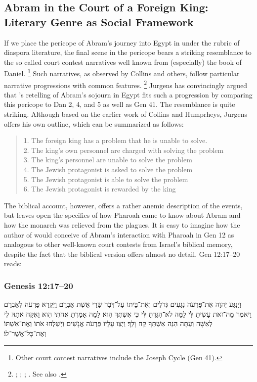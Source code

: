 \subsection{Abram in the Court of a Foreign King: Literary Genre as Social Framework}

If we place the pericope of Abram's journey into Egypt in \ga under the rubric of diaspora literature, the final scene in the pericope bears a striking resemblance to the so called court contest narratives well known from (especially) the book of Daniel.%
    \footnote{Other court contest narratives include the Joseph Cycle (Gen 41).}
Such narratives, as observed by Collins and others, follow particular narrative progressions with common features.%
    \footnote{\Cite[38--52]{collins1993}; \cite{humphreys_jbl1973}; \cite{collins_jbl1975}; \cite{wills1990}. See also \cite{niditch-doran_jbl1977}.}
Jurgens has convincingly argued that \ga's retelling of Abram's sojourn in Egypt fits such a progression by comparing this pericope to Dan 2, 4, and 5 as well as Gen 41. The resemblance is quite striking. Although based on the earlier work of Collins and Humprheys, Jurgens offers his own outline, which can be summarized as follows:%
    \autocite[21]{jurgens_jsj2018}
\begin{quote}
    1. The foreign king has a problem that he is unable to solve.\\
    2. The king's own personnel are charged with solving the problem\\
    3. The king's personnel are unable to solve the problem\\
    4. The Jewish protagonist is asked to solve the problem\\
    5. The Jewish protagonist is able to solve the problem\\
    6. The Jewish protagonist is rewarded by the king
\end{quote}
\noindent
The biblical account, however, offers a rather anemic description of the events, but leaves open the specifics of how Pharoah came to know about Abram and how the monarch was relieved from the plagues. 
It is easy to imagine how the author of \ga would conceive of Abram's interaction with Pharoah in Gen 12 as analogous to other well-known court contests from Israel's biblical memory, despite the fact that the biblical version offers almost no detail. Gen 12:17--20 reads: 

\subsubsection{Genesis 12:17--20}
\begin{hebrewtext}
    ‏וַיְנַגַּע יְהוָה אֶת־פַּרְעֹה נְגָעִים גְּדֹלִים וְאֶת־בֵּיתוֹ עַל־דְּבַר שָׂרַי אֵשֶׁת אַבְרָם׃
    וַיִּקְרָא פַרְעֹה לְאַבְרָם וַיֹּאמֶר מַה־זֹּאת עָשִׂיתָ לִּי לָמָּה לֹא־הִגַּדְתָּ לִּי כִּי אִשְׁתְּךָ הִוא׃
    לָמָה אָמַרְתָּ אֲחֹתִי הִוא וָאֶקַּח אֹתָהּ לִי לְאִשָּׁה וְעַתָּה הִנֵּה אִשְׁתְּךָ קַח וָלֵךְ׃ 
    וַיְצַו עָלָיו פַּרְעֹה אֲנָשִׁים וַיְשַׁלְּחוּ אֹתוֹ וְאֶת־אִשְׁתּוֹ וְאֶת־כָּל־אֲשֶׁר־לוֹ׃
\end{hebrewtext}

